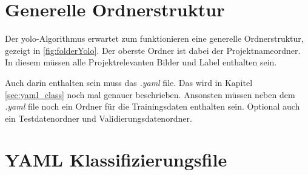 \section*{Generelle Ordnerstruktur}
Der \ac{yolo}-Algorithmus erwartet zum funktionieren eine generelle Ordnerstruktur, gezeigt in \ref{fig:folderYolo}. Der oberste Ordner ist dabei der Projektnameordner. In diesem müssen alle Projektrelevanten Bilder und Label enthalten sein. 

Auch darin enthalten sein muss das \textit{.yaml} file. Das wird in Kapitel \ref{sec:yaml_class} noch mal genauer beschrieben. Ansonsten müssen neben dem \textit{.yaml} file noch ein Ordner für die Trainingsdaten enthalten sein. Optional auch ein Testdatenordner und Validierungsdatenordner.

\section*{YAML Klassifizierungsfile}
\label{sec:yaml_class}
